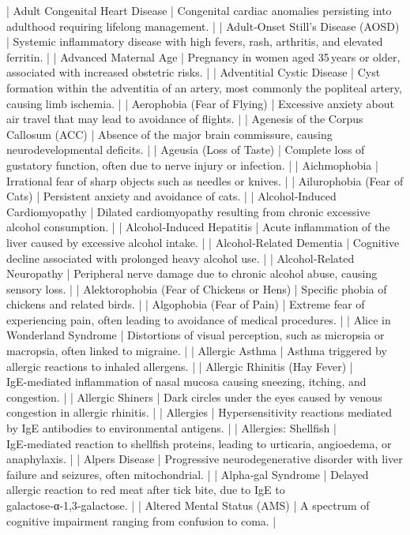 | Adult Congenital Heart Disease | Congenital cardiac anomalies persisting into adulthood requiring lifelong management. |
| Adult‑Onset Still's Disease (AOSD) | Systemic inflammatory disease with high fevers, rash, arthritis, and elevated ferritin. |
| Advanced Maternal Age | Pregnancy in women aged 35 years or older, associated with increased obstetric risks. |
| Adventitial Cystic Disease | Cyst formation within the adventitia of an artery, most commonly the popliteal artery, causing limb ischemia. |
| Aerophobia (Fear of Flying) | Excessive anxiety about air travel that may lead to avoidance of flights. |
| Agenesis of the Corpus Callosum (ACC) | Absence of the major brain commissure, causing neurodevelopmental deficits. |
| Ageusia (Loss of Taste) | Complete loss of gustatory function, often due to nerve injury or infection. |
| Aichmophobia | Irrational fear of sharp objects such as needles or knives. |
| Ailurophobia (Fear of Cats) | Persistent anxiety and avoidance of cats. |
| Alcohol‑Induced Cardiomyopathy | Dilated cardiomyopathy resulting from chronic excessive alcohol consumption. |
| Alcohol‑Induced Hepatitis | Acute inflammation of the liver caused by excessive alcohol intake. |
| Alcohol‑Related Dementia | Cognitive decline associated with prolonged heavy alcohol use. |
| Alcohol‑Related Neuropathy | Peripheral nerve damage due to chronic alcohol abuse, causing sensory loss. |
| Alektorophobia (Fear of Chickens or Hens) | Specific phobia of chickens and related birds. |
| Algophobia (Fear of Pain) | Extreme fear of experiencing pain, often leading to avoidance of medical procedures. |
| Alice in Wonderland Syndrome | Distortions of visual perception, such as micropsia or macropsia, often linked to migraine. |
| Allergic Asthma | Asthma triggered by allergic reactions to inhaled allergens. |
| Allergic Rhinitis (Hay Fever) | IgE‑mediated inflammation of nasal mucosa causing sneezing, itching, and congestion. |
| Allergic Shiners | Dark circles under the eyes caused by venous congestion in allergic rhinitis. |
| Allergies | Hypersensitivity reactions mediated by IgE antibodies to environmental antigens. |
| Allergies: Shellfish | IgE‑mediated reaction to shellfish proteins, leading to urticaria, angioedema, or anaphylaxis. |
| Alpers Disease | Progressive neurodegenerative disorder with liver failure and seizures, often mitochondrial. |
| Alpha‑gal Syndrome | Delayed allergic reaction to red meat after tick bite, due to IgE to galactose‑α‑1,3‑galactose. |
| Altered Mental Status (AMS) | A spectrum of cognitive impairment ranging from confusion to coma. |
